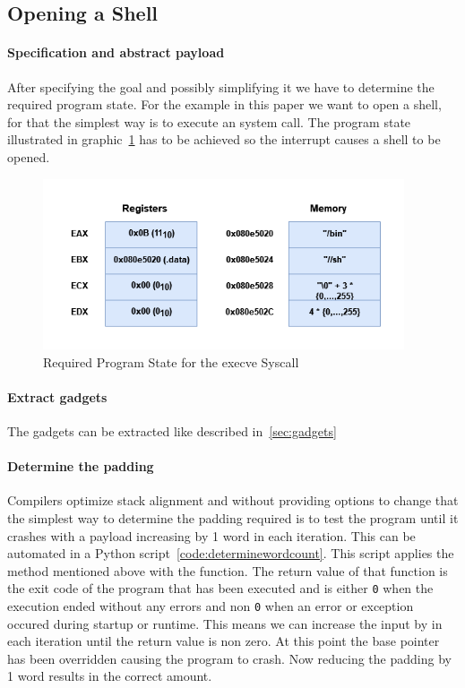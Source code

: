 \documentclass[journal=tosc,submission, notanonymous]{iacrtrans}
\begin{document}
\subsection{Opening a Shell}
\paragraph{Specification and abstract payload}
\label{par:goal}
After specifying the goal and possibly simplifying it we have to determine the required program state. For the example in this paper we want to open a shell, for that the simplest way is to execute an  system call. The program state illustrated in graphic~\cref{fig:stateforint} has to be achieved so the interrupt  causes a shell to be opened.~\cite{pixis}~\cite{proggen-rop}
\begin{figure}[h]
  \centering
  \includegraphics[width=0.95\textwidth]{requirementstackmemory.png}
  \caption{Required Program State for the execve Syscall}
  \label{fig:stateforint}
\end{figure}
\paragraph{Extract gadgets}
The gadgets can be extracted like described in~\cref{sec:gadgets}
\paragraph{Determine the padding}
\label{par:padding}
Compilers optimize stack alignment and without providing options to change that the simplest way to determine the padding required is to test the program until it crashes with a payload increasing by 1 word in each iteration. This can be automated in a Python script~\cref{code:determinewordcount}. This script applies the method mentioned above with the  function. The return value of that function is the exit code of the program that has been executed and is either \Verb+0+ when the execution ended without any errors and non \Verb+0+ when an error or exception occured during startup or runtime. This means we can increase the input by  in each iteration until the return value is non zero. At this point the base pointer  has been overridden causing the program to crash. Now reducing the padding by 1 word results in the correct amount.
\end{document}
